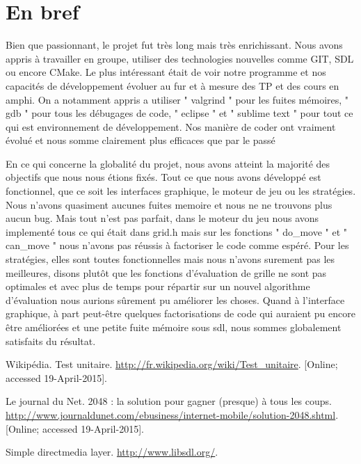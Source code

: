 \documentclass[12pt]{article}
\begin{document}
\section{En bref}
Bien que passionnant, le projet fut très long mais très enrichissant. Nous
avons appris à travailler en groupe, utiliser des technologies nouvelles comme
GIT, SDL ou encore CMake. Le plus intéressant était de voir notre programme et nos capacités
de développement évoluer au fur et à mesure des TP et des cours en amphi.
On a notamment appris a utiliser " valgrind " pour les fuites mémoires, " gdb " pour tous
les débugages de code, " eclipse " et " sublime text " pour
tout ce qui est environnement de développement. Nos manière de coder ont vraiment
évolué et nous somme clairement plus efficaces que par le passé
\par En ce qui concerne la globalité du projet, nous avons atteint la
majorité des objectifs que nous nous étions fixés. Tout ce que nous avons
développé est fonctionnel, que ce soit les interfaces graphique, le moteur
de jeu ou les stratégies. Nous n'avons quasiment aucunes fuites memoire et nous ne
ne trouvons plus aucun bug. 
\ar Mais tout n'est pas parfait, dans le moteur du jeu
nous avons implementé tous ce qui était dans grid.h mais sur les fonctions
" do\_move " et " can\_move " nous n'avons pas réussis à
factoriser le code comme espéré. Pour les stratégies, elles sont toutes
fonctionnelles mais nous n'avons surement pas les meilleures, disons plutôt que les fonctions
d'évaluation de grille ne sont pas optimales et avec plus de temps pour répartir sur un nouvel
algorithme d'évaluation nous aurions sûrement pu améliorer les choses.
Quand à l'interface graphique, à part peut-être quelques factorisations de code qui auraient
pu encore être améliorées et une petite fuite mémoire sous sdl, nous sommes globalement satisfaits
du résultat.

\newpage

\begin{thebibliography}{1}
   Wikipédia. Test unitaire.
  \url{http://fr.wikipedia.org/wiki/Test_unitaire}. [Online; accessed
  19-April-2015].

   Le journal du Net. 2048 : la solution pour gagner (presque) à
  tous les coups.
  \url{http://www.journaldunet.com/ebusiness/internet-mobile/solution-2048.shtml}. [Online; accessed 19-April-2015].

   Simple directmedia layer. \url{http://www.libsdl.org/}.
\end{thebibliography}
\end{document}
